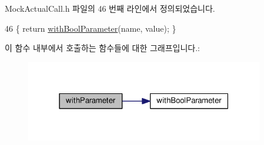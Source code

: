 Mock\+Actual\+Call.\+h 파일의 46 번째 라인에서 정의되었습니다.


\begin{DoxyCode}
46 \{ \textcolor{keywordflow}{return} \hyperlink{class_mock_actual_call_a298a4dab743c253b66c33dad235b842d}{withBoolParameter}(name, value); \}
\end{DoxyCode}


이 함수 내부에서 호출하는 함수들에 대한 그래프입니다.\+:
\nopagebreak
\begin{figure}[H]
\begin{center}
\leavevmode
\includegraphics[width=295pt]{class_mock_actual_call_a158f3ada8f73127b977d5353d4e4dea0_cgraph}
\end{center}
\end{figure}





